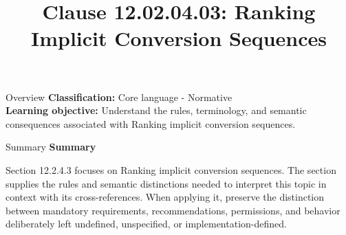 \documentclass[10pt,letterpaper]{article}
\title{Clause 12.02.04.03: Ranking Implicit Conversion Sequences}
\author{}
\date{}
\begin{document}
\maketitle
\begin{CornellOverviewBox}{Overview}
\textbf{Classification:} Core language - Normative\\[2pt]
\textbf{Learning objective:} Understand the rules, terminology, and semantic consequences associated with Ranking implicit conversion sequences.
\end{CornellOverviewBox}\begin{CornellSummaryBox}{Summary}
{\sffamily\bfseries\color{Accent} Summary}\par\vspace{3pt}Section 12.2.4.3 focuses on Ranking implicit conversion sequences. The section supplies the rules and semantic distinctions needed to interpret this topic in context with its cross-references. When applying it, preserve the distinction between mandatory requirements, recommendations, permissions, and behavior deliberately left undefined, unspecified, or implementation-defined.
\end{CornellSummaryBox}
\end{document}
